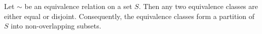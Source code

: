 Let $\sim$ be an equivalence relation on a set $S$. Then any two equivalence classes are either equal or disjoint. Consequently, the equivalence classes form a partition of $S$ into non-overlapping subsets.

